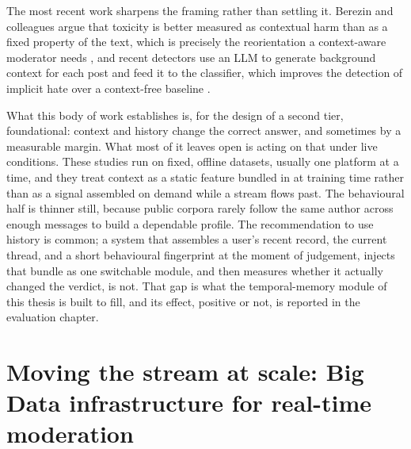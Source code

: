 The most recent work sharpens the framing rather than settling it. Berezin and colleagues argue that toxicity is better measured as contextual harm than as a fixed property of the text, which is precisely the reorientation a context-aware moderator needs \citep{contextualharm2025}, and recent detectors use an LLM to generate background context for each post and feed it to the classifier, which improves the detection of implicit hate over a context-free baseline \citep{implicitctx2025}.

What this body of work establishes is, for the design of a second tier, foundational: context and history change the correct answer, and sometimes by a measurable margin. What most of it leaves open is acting on that under live conditions. These studies run on fixed, offline datasets, usually one platform at a time, and they treat context as a static feature bundled in at training time rather than as a signal assembled on demand while a stream flows past. The behavioural half is thinner still, because public corpora rarely follow the same author across enough messages to build a dependable profile. The recommendation to use history is common; a system that assembles a user's recent record, the current thread, and a short behavioural fingerprint at the moment of judgement, injects that bundle as one switchable module, and then measures whether it actually changed the verdict, is not. That gap is what the temporal-memory module of this thesis is built to fill, and its effect, positive or not, is reported in the evaluation chapter.

\section{Moving the stream at scale: Big Data infrastructure for real-time moderation}\label{big-data-streaming-for-real-time-nlp}

